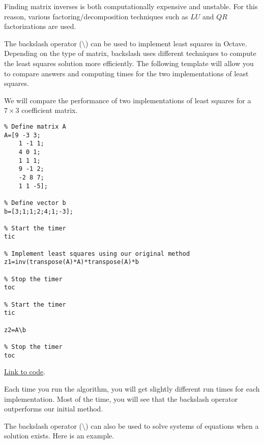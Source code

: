 \documentclass{ximera}
\begin{document}
\begin{warning}
    Finding matrix inverses is both computationally expensive and unstable.  For this reason, various factoring/decomposition techniques such as $LU$ and $QR$ factorizations are used.  
\end{warning}

The 
backslash operator ($\setminus$) can be used to implement least squares in Octave.  Depending on the type of matrix, backslash uses different techniques to compute the least squares solution more efficiently.  The following template will allow you to compare answers and computing times for the two implementations of least squares.

\begin{template}\label{temp:LeastSquaresComp}
We will compare the performance of two implementations of least squares for a $7\times 3$ coefficient matrix.

    \begin{verbatim}
% Define matrix A
A=[9 -3 3;
    1 -1 1;
    4 0 1;
    1 1 1; 
    9 -1 2;
    -2 8 7;
    1 1 -5];
        
% Define vector b
b=[3;1;1;2;4;1;-3];

% Start the timer
tic

% Implement least squares using our original method
z1=inv(transpose(A)*A)*transpose(A)*b

% Stop the timer
toc

% Start the timer
tic

z2=A\b

% Stop the timer
toc
    \end{verbatim}

\href{https://sagecell.sagemath.org/?z=eJx9TkFqwzAQvAv0h7kE0oKgslPaYHww9NJzjkkPsrtNBJbkSusQ8vpYxCnNod1Zlh12htkF3ujLeoIzHO0JjRRNvV1DlSgrKTCVhtLQM1nh6WfXGRWuZJ1VxXxRBV7x8kumnj9mlkuKxS32SB2HiFaKtt6WlZ5QVKtpqjI7snLDJjL4QGDrKErBtrte3t3QkyPP6MkkRvoeTaSEMVm_RxgjQrR7600PR3wIn1KcdW39ccnR-DSERMvm4XHqO97ecsNwFxu6_x86F3Wz-9t8Af-UXbs=&lang=octave&interacts=eJyLjgUAARUAuQ==}{Link to code}.   

Each time you run the algorithm, you will get slightly different run times for each implementation.  Most of the time, you will see that the backslash operator outperforms our initial method. 
\end{template}



The 
backslash operator ($\setminus$) can also be used to solve systems of equations when a solution exists.  Here is an example.
\end{document}
